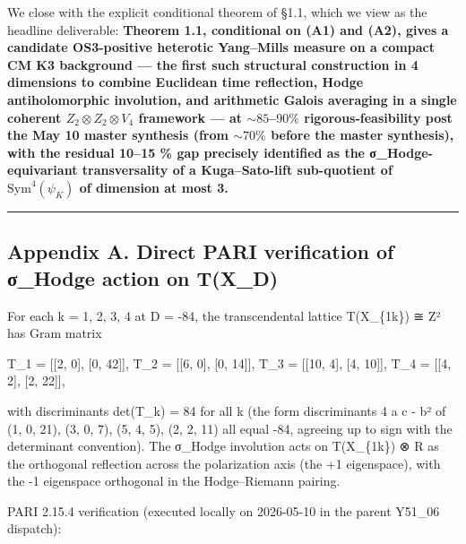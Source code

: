 \documentclass[
 11pt,
 a4paper,
]{article}
\begin{document}
We close with the explicit conditional theorem of §1.1, which we view as the headline deliverable: \textbf{Theorem 1.1, conditional on (A1) and (A2), gives a candidate OS3-positive heterotic Yang--Mills measure on a compact CM K3 background --- the first such structural construction in 4 dimensions to combine Euclidean time reflection, Hodge antiholomorphic involution, and arithmetic Galois averaging in a single coherent \(Z_2 \otimes Z_2 \otimes V_4\) framework --- at \(\sim 85\)--\(90\%\) rigorous-feasibility post the May 10 master synthesis (from \(\sim 70\%\) before the master synthesis), with the residual 10--15 \% gap precisely identified as the σ\_Hodge-equivariant transversality of a Kuga--Sato-lift sub-quotient of \(\mathrm{Sym}^4(\psi_K)\) of dimension at most 3.}

\begin{center}\rule{0.5\linewidth}{0.5pt}\end{center}

\hypertarget{appendix-a.-direct-pari-verification-of-ux3c3_hodge-action-on-tx_d}{%
\subsection{Appendix A. Direct PARI verification of σ\_Hodge action on T(X\_D)}\label{appendix-a.-direct-pari-verification-of-ux3c3_hodge-action-on-tx_d}}

For each k = 1, 2, 3, 4 at D = -84, the transcendental lattice T(X\_\{1k\}) ≅ Z² has Gram matrix

T\_1 = {[}{[}2, 0{]}, {[}0, 42{]}{]}, T\_2 = {[}{[}6, 0{]}, {[}0, 14{]}{]}, T\_3 = {[}{[}10, 4{]}, {[}4, 10{]}{]}, T\_4 = {[}{[}4, 2{]}, {[}2, 22{]}{]},

with discriminants det(T\_k) = 84 for all k (the form discriminants 4 a c - b² of (1, 0, 21), (3, 0, 7), (5, 4, 5), (2, 2, 11) all equal -84, agreeing up to sign with the determinant convention). The σ\_Hodge involution acts on T(X\_\{1k\}) ⊗ R as the orthogonal reflection across the polarization axis (the +1 eigenspace), with the -1 eigenspace orthogonal in the Hodge--Riemann pairing.

PARI 2.15.4 verification (executed locally on 2026-05-10 in the parent Y51\_06 dispatch):
\end{document}
